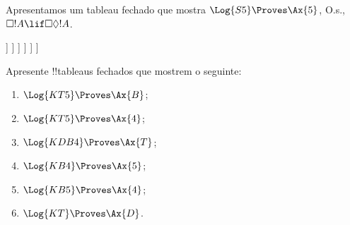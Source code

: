 \documentclass[../../../include/open-logic-section]{subfiles}
\begin{document}
\begin{ex}
  Apresentamos um tableau fechado que mostra $\Log{S5} \Proves \Ax{5}$, O.s.\@,
  $\Box!A \lif \Box\Diamond!A$.
  \begin{oltableau}
    [\pFmla{\False}{\Box\formula{A} \lif \Box\Diamond \formula{A}}{1},
      just = \TAss
      [\pFmla{\True}{\Box \formula{A}}{1}, just = {\TRule{\False}{\lif}[1]}
        [\pFmla{\False}{\Box\Diamond \formula{A}}{1},
          just = {\TRule{\False}{\lif}[1]}
          [\pFmla{\False}{\Diamond \formula{A}}{1.1},
            just = {\TRule{\False}{\Box}[3]}
            [\pFmla{\False}{\Diamond \formula{A}}{1},
              just = {4r$\Diamond$ 4}
              [\pFmla{\False}{\formula{A}}{1.1},
                just = {\TRule{\False}{\Diamond}[5]}
                [\pFmla{\True}{\formula{A}}{1.1},
                  just = {\TRule{\True}{\Box}[2]}, close]
              ]
            ]
          ]
        ]
      ]
    ]
  \end{oltableau}
\end{ex}

\begin{prob}
Apresente !!{tableau}s fechados que mostrem o seguinte:
  \begin{enumerate}
  \item $\Log{KT5} \Proves \Ax{B}$;
  \item $\Log{KT5} \Proves \Ax{4}$;
  \item $\Log{KDB4} \Proves \Ax{T}$;
  \item $\Log{KB4} \Proves \Ax{5}$;
  \item $\Log{KB5} \Proves \Ax{4}$;
  \item $\Log{KT} \Proves \Ax{D}$.
  \end{enumerate}
\end{prob}
\end{document}
